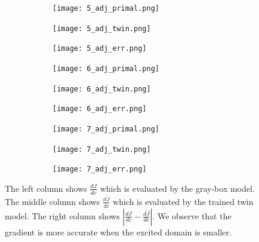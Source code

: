 \documentclass{paper1}
\begin{document}
\begin{figure}
    \begin{subfigure}[b]{.95\textwidth}
          \centering
          \begin{subfigure}[b]{0.32\textwidth}
                  \centering
                  \texttt{[image: 5\_adj\_primal.png]}
          \end{subfigure}%
          \begin{subfigure}[b]{0.32\textwidth}
                  \centering
                  \texttt{[image: 5\_adj\_twin.png]}
          \end{subfigure}
          \begin{subfigure}[b]{0.32\textwidth}
                  \centering
                  \texttt{[image: 5\_adj\_err.png]}
          \end{subfigure}
    \end{subfigure}
    \begin{subfigure}[b]{.95\textwidth}
          \centering
          \begin{subfigure}[b]{0.32\textwidth}
                  \centering
                  \texttt{[image: 6\_adj\_primal.png]}
          \end{subfigure}%
          \begin{subfigure}[b]{0.32\textwidth}
                  \centering
                  \texttt{[image: 6\_adj\_twin.png]}
          \end{subfigure}
          \begin{subfigure}[b]{0.32\textwidth}
                  \centering
                  \texttt{[image: 6\_adj\_err.png]}
          \end{subfigure}%
    \end{subfigure}
    \begin{subfigure}[b]{.95\textwidth}
          \centering
          \begin{subfigure}[b]{0.32\textwidth}
                  \centering
                  \texttt{[image: 7\_adj\_primal.png]}
          \end{subfigure}%
          \begin{subfigure}[b]{0.32\textwidth}
                  \centering
                  \texttt{[image: 7\_adj\_twin.png]}
          \end{subfigure}
          \begin{subfigure}[b]{0.32\textwidth}
                  \centering
                  \texttt{[image: 7\_adj\_err.png]}
          \end{subfigure}
    \end{subfigure}

    \caption{
             \label{fig:adj compare}
             The left column shows $\frac{dJ}{dc}$ which is evaluated by the gray-box model. 
             The middle column shows $\frac{d\tilde{J}}{dc}$ which is evaluated by the trained 
             twin model. The right column shows $\left|\frac{dJ}{dc} - \frac{d\tilde{J}}{dc}\right|$.
             We observe that the gradient is more accurate when the excited domain is smaller.}
\end{figure}
\end{document}
